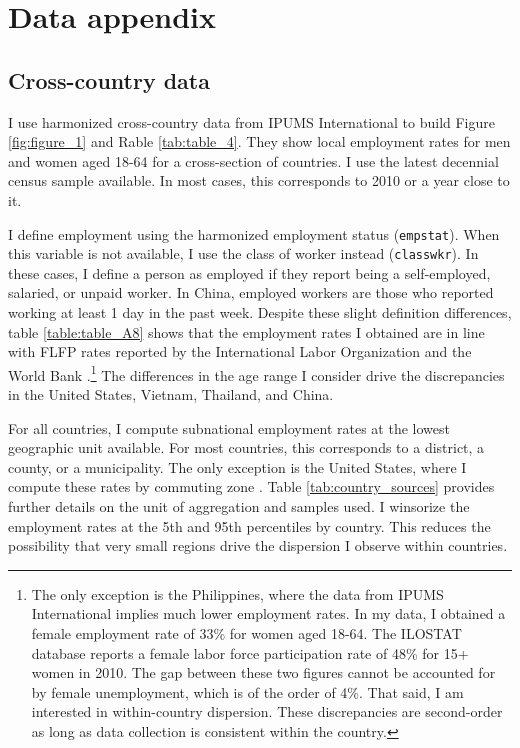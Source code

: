 

\section{Data appendix}


\subsection{Cross-country data}
\label{sec:country_data}
I use harmonized cross-country data from IPUMS International to build Figure \ref{fig:figure_1} and
Rable \ref{tab:table_4}. They show local employment rates for men and women aged 18-64 for a
cross-section of countries. I use the latest decennial census sample available. In
most cases, this corresponds to 2010 or a year close to it.

I define employment using the harmonized employment status ({\tt empstat}). When this variable is not available, I use the class of worker instead ({\tt classwkr}). In these cases, I define a person as employed if they report being a self-employed, salaried, or unpaid worker. In China, employed workers are those who reported working at least 1 day in the past week. Despite these slight definition differences, table \ref{table:table_A8} shows that the employment rates I obtained are in line with FLFP rates reported by the International Labor Organization and the World Bank \citep{InternationalLaborOrganization2021}.\footnote{The only exception is the Philippines, where the data from IPUMS International implies much lower employment rates. In my data, I obtained a female employment rate of 33\% for women aged 18-64. The ILOSTAT database reports a female labor force participation rate of 48\% for 15+ women in 2010. The gap between these two figures cannot be accounted for by female unemployment, which is of the order of 4\%. That said, I am interested in within-country dispersion. These discrepancies are second-order as long as data collection is consistent within the country.} The differences in the age range I consider drive the discrepancies in the United States, Vietnam, Thailand, and China.


For all countries, I compute subnational employment rates at the lowest geographic unit available. For most countries, this corresponds to a district, a county, or a municipality. The only exception is the United States, where I compute these rates by commuting zone \citep{Autor2013}. Table \ref{tab:country_sources} provides further details on the unit of aggregation and samples used. I winsorize the employment rates at the 5th and 95th percentiles by country. This reduces the possibility that very small regions drive the dispersion I observe within countries.

